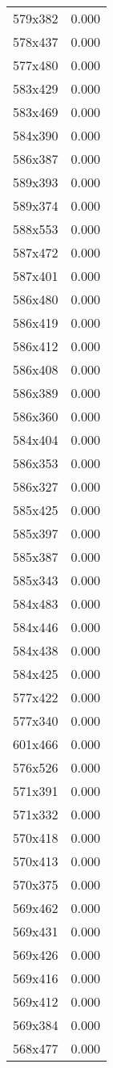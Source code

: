 \begin{table}
\begin{tabular}{lr}
579x382 & 0.000 \\
578x437 & 0.000 \\
577x480 & 0.000 \\
583x429 & 0.000 \\
583x469 & 0.000 \\
584x390 & 0.000 \\
586x387 & 0.000 \\
589x393 & 0.000 \\
589x374 & 0.000 \\
588x553 & 0.000 \\
587x472 & 0.000 \\
587x401 & 0.000 \\
586x480 & 0.000 \\
586x419 & 0.000 \\
586x412 & 0.000 \\
586x408 & 0.000 \\
586x389 & 0.000 \\
586x360 & 0.000 \\
584x404 & 0.000 \\
586x353 & 0.000 \\
586x327 & 0.000 \\
585x425 & 0.000 \\
585x397 & 0.000 \\
585x387 & 0.000 \\
585x343 & 0.000 \\
584x483 & 0.000 \\
584x446 & 0.000 \\
584x438 & 0.000 \\
584x425 & 0.000 \\
577x422 & 0.000 \\
577x340 & 0.000 \\
601x466 & 0.000 \\
576x526 & 0.000 \\
571x391 & 0.000 \\
571x332 & 0.000 \\
570x418 & 0.000 \\
570x413 & 0.000 \\
570x375 & 0.000 \\
569x462 & 0.000 \\
569x431 & 0.000 \\
569x426 & 0.000 \\
569x416 & 0.000 \\
569x412 & 0.000 \\
569x384 & 0.000 \\
568x477 & 0.000 \\

\end{tabular}
\end{table}
